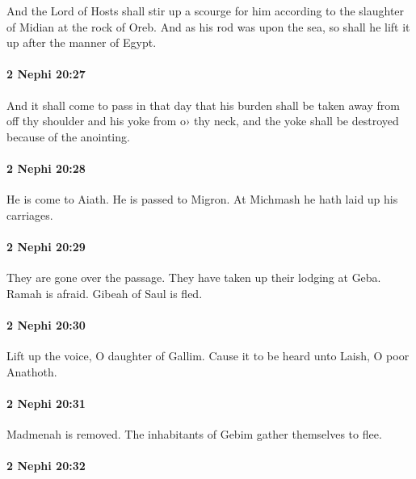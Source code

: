 			And the Lord of Hosts shall stir up a scourge for him
			according to the slaughter of Midian at the rock of Oreb.
			And as his rod was upon the sea,
			so shall he lift it up after the manner of Egypt.

		\paragraph{2 Nephi 20:27} %
			\label{2NEPHI-20-27}

			And it shall come to pass in that day
			that his burden shall be taken away from off thy shoulder
			and his yoke from o› thy neck,
			and the yoke shall be destroyed because of the anointing.

		\paragraph{2 Nephi 20:28} %
			\label{2NEPHI-20-28}

			He is come to Aiath.
			He is passed to Migron.
			At Michmash he hath laid up his carriages.

		\paragraph{2 Nephi 20:29} %
			\label{2NEPHI-20-29}

			They are gone over the passage.
			They have taken up their lodging at Geba.
			Ramah is afraid.
			Gibeah of Saul is fled.

		\paragraph{2 Nephi 20:30} %
			\label{2NEPHI-20-30}

			Lift up the voice, O daughter of Gallim.
			Cause it to be heard unto Laish,
			O poor Anathoth.

		\paragraph{2 Nephi 20:31} %
			\label{2NEPHI-20-31}

			Madmenah is removed.
			The inhabitants of Gebim gather themselves to flee.

		\paragraph{2 Nephi 20:32} %
			\label{2NEPHI-20-32}

